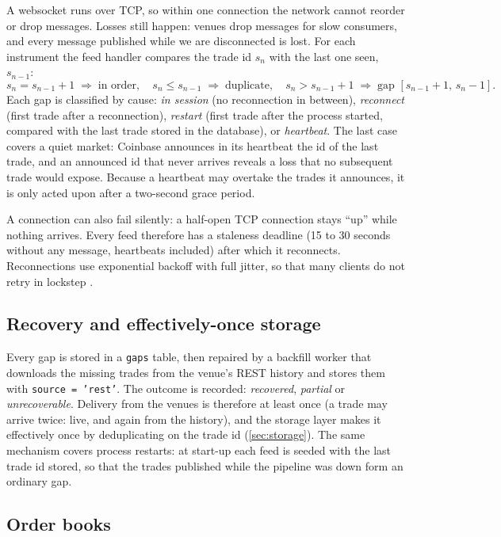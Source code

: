 \documentclass[11pt,a4paper]{article}
\newcommand{\code}[1]{\texttt{#1}}
\begin{document}
A websocket runs over TCP, so within one connection the network cannot reorder or drop messages. Losses still
happen: venues drop messages for slow consumers, and every message published while we are disconnected is
lost. For each instrument the feed handler compares the trade id $s_n$ with the last one seen, $s_{n-1}$:
\[
  s_n = s_{n-1} + 1 \;\Rightarrow\; \text{in order}, \quad
  s_n \le s_{n-1} \;\Rightarrow\; \text{duplicate}, \quad
  s_n > s_{n-1} + 1 \;\Rightarrow\; \text{gap } [s_{n-1}+1,\, s_n-1].
\]
Each gap is classified by cause: \emph{in session} (no reconnection in between), \emph{reconnect} (first trade
after a reconnection), \emph{restart} (first trade after the process started, compared with the last trade
stored in the database), or \emph{heartbeat}. The last case covers a quiet market: Coinbase announces in its
heartbeat the id of the last trade, and an announced id that never arrives reveals a loss that no subsequent
trade would expose. Because a heartbeat may overtake the trades it announces, it is only acted upon after a
two-second grace period.

A connection can also fail silently: a half-open TCP connection stays ``up'' while nothing arrives. Every feed
therefore has a staleness deadline (15 to 30 seconds without any message, heartbeats included) after which it
reconnects. Reconnections use exponential backoff with full jitter, so that many clients do not retry in
lockstep \citep{brooker2015}.

\subsection{Recovery and effectively-once storage}

Every gap is stored in a \code{gaps} table, then repaired by a backfill worker that downloads the missing trades
from the venue's REST history and stores them with \code{source = 'rest'}. The outcome is recorded:
\emph{recovered}, \emph{partial} or \emph{unrecoverable}. Delivery from the venues is therefore at least once
(a trade may arrive twice: live, and again from the history), and the storage layer makes it effectively once
by deduplicating on the trade id (\cref{sec:storage}). The same mechanism covers process restarts: at start-up
each feed is seeded with the last trade id stored, so that the trades published while the pipeline was down
form an ordinary gap.

\subsection{Order books}
\end{document}
